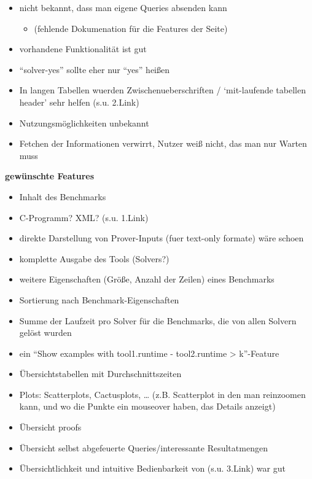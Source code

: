 \begin{itemize}
\tightlist
\item
  nicht bekannt, dass man eigene Queries absenden kann

  \begin{itemize}
  \tightlist
  \item
    (fehlende Dokumenation für die Features der Seite)
  \end{itemize}
\item
  vorhandene Funktionalität ist gut
\item
  ``solver-yes'' sollte eher nur ``yes'' heißen
\item
  In langen Tabellen wuerden Zwischenueberschriften / `mit-laufende
  tabellen header' sehr helfen (s.u. 2.Link)
\item
  Nutzungsmöglichkeiten unbekannt
\item
  Fetchen der Informationen verwirrt, Nutzer weiß nicht, das man nur
  Warten muss
\end{itemize}

\textbf{gewünschte Features}

\begin{itemize}
\tightlist
\item
  Inhalt des Benchmarks
\item
  C-Programm? XML? (s.u. 1.Link)
\item
  direkte Darstellung von Prover-Inputs (fuer text-only formate) wäre
  schoen
\item
  komplette Ausgabe des Tools (Solvers?)
\item
  weitere Eigenschaften (Größe, Anzahl der Zeilen) eines Benchmarks
\item
  Sortierung nach Benchmark-Eigenschaften
\item
  Summe der Laufzeit pro Solver für die Benchmarks, die von allen
  Solvern gelöst wurden
\item
  ein ``Show examples with \textbar{}tool1.runtime -
  tool2.runtime\textbar{} \textgreater{} k''-Feature
\item
  Übersichtstabellen mit Durchschnittszeiten
\item
  Plots: Scatterplots, Cactusplots, \ldots{} (z.B. Scatterplot in den
  man reinzoomen kann, und wo die Punkte ein mouseover haben, das
  Details anzeigt)
\item
  Übersicht proofs
\item
  Übersicht selbst abgefeuerte Queries/interessante Resultatmengen
\item
  Übersichtlichkeit und intuitive Bedienbarkeit von (s.u. 3.Link) war
  gut
\end{itemize}

